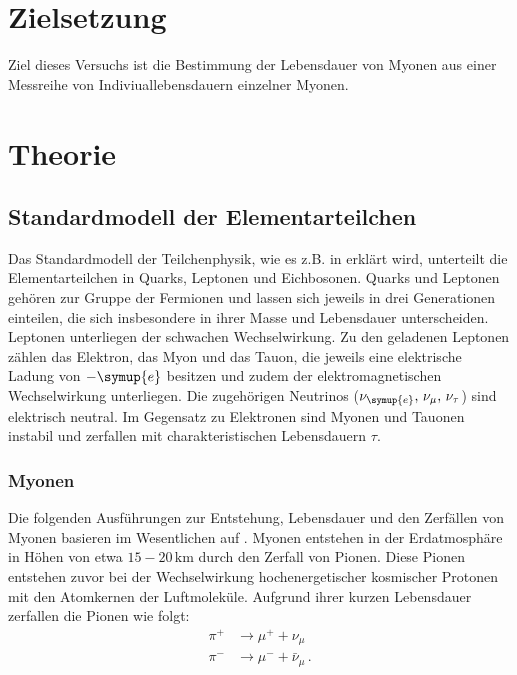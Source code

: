 \section{Zielsetzung}
\label{sec:Zielsetzung}
Ziel dieses Versuchs ist die Bestimmung der Lebensdauer von Myonen aus einer Messreihe von Indiviuallebensdauern einzelner Myonen.
\section{Theorie}
\label{sec:Theorie}
\subsection{Standardmodell der Elementarteilchen}
Das Standardmodell der Teilchenphysik, wie es z.B. in \cite{Astroteilchenphysik} erklärt wird, unterteilt die Elementarteilchen in Quarks, Leptonen und Eichbosonen.
Quarks und Leptonen gehören zur Gruppe der Fermionen und lassen sich jeweils in drei Generationen einteilen, 
die sich insbesondere in ihrer Masse und Lebensdauer unterscheiden.\\
Leptonen unterliegen der schwachen Wechselwirkung. 
Zu den geladenen Leptonen zählen das Elektron, das Myon und das Tauon, die jeweils eine elektrische Ladung von $-\symup{e}$ besitzen und zudem der elektromagnetischen Wechselwirkung 
unterliegen. 
Die zugehörigen Neutrinos ($\nu_{\symup{e}},\, \nu_\mu,\, \nu_\tau$) sind elektrisch neutral. Im Gegensatz zu Elektronen sind Myonen und Tauonen instabil und zerfallen mit charakteristischen Lebensdauern $\tau$.

\subsubsection{Myonen}
\label{sec:Myonen}
Die folgenden Ausführungen zur Entstehung, Lebensdauer und den Zerfällen von Myonen basieren im Wesentlichen auf \cite{Astroteilchenphysik}.
Myonen entstehen in der Erdatmosphäre in Höhen von etwa $15{-}20\,\unit{\kilo\meter}$ durch den Zerfall von Pionen. 
Diese Pionen entstehen zuvor bei der Wechselwirkung hochenergetischer kosmischer Protonen mit den Atomkernen der Luftmoleküle. 
Aufgrund ihrer kurzen Lebensdauer zerfallen die Pionen wie folgt:
\begin{align*}
	\pi^+ &\rightarrow \mu^+ + \nu_\mu \\
	\pi^- &\rightarrow \mu^- + \bar{\nu}_\mu\,.
\end{align*}

